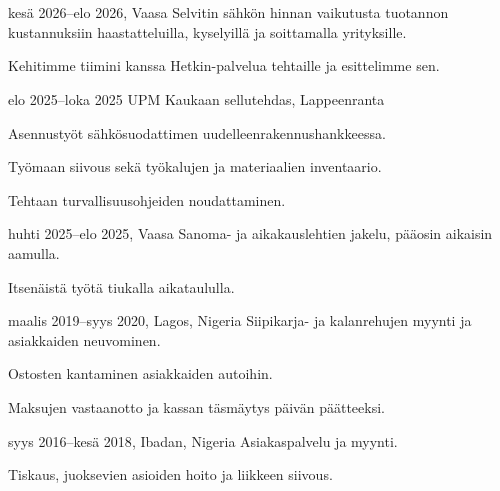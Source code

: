 \documentclass[a4paper,11pt]{article}
\begin{document}
\section{}
\begin{cventry}{kesä 2026--elo 2026}{, Vaasa}
  Selvitin sähkön hinnan vaikutusta tuotannon kustannuksiin haastatteluilla, kyselyillä ja soittamalla yrityksille.\par
  Kehitimme tiimini kanssa Hetkin-palvelua tehtaille ja esittelimme sen.
\end{cventry}
\begin{cventry}{elo 2025--loka 2025}{}
  UPM Kaukaan sellutehdas, Lappeenranta\par
  Asennustyöt sähkösuodattimen uudelleenrakennushankkeessa.\par
  Työmaan siivous sekä työkalujen ja materiaalien inventaario.\par
  Tehtaan turvallisuusohjeiden noudattaminen.
\end{cventry}
\begin{cventry}{huhti 2025--elo 2025}{, Vaasa}
  Sanoma- ja aikakauslehtien jakelu, pääosin aikaisin aamulla.\par
  Itsenäistä työtä tiukalla aikataululla.
\end{cventry}
\begin{cventry}{maalis 2019--syys 2020}{, Lagos, Nigeria}
  Siipikarja- ja kalanrehujen myynti ja asiakkaiden neuvominen.\par
  Ostosten kantaminen asiakkaiden autoihin.\par
  Maksujen vastaanotto ja kassan täsmäytys päivän päätteeksi.
\end{cventry}
\begin{cventry}{syys 2016--kesä 2018}{, Ibadan, Nigeria}
  Asiakaspalvelu ja myynti.\par
  Tiskaus, juoksevien asioiden hoito ja liikkeen siivous.
\end{cventry}
\end{document}
